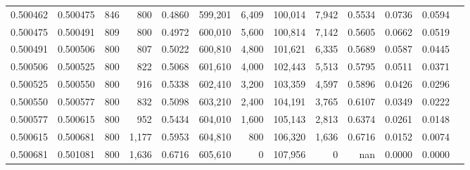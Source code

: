 \begin{tabular}{rrrrrrrrrrrrr}
0.500462 & 0.500475 &    846 &   800 &                                     0.4860 & 599,201 &   6,409 & 100,014 &   7,942 & 0.5534 & 0.0736 & 0.0594 \\
0.500475 & 0.500491 &    809 &   800 &                                     0.4972 & 600,010 &   5,600 & 100,814 &   7,142 & 0.5605 & 0.0662 & 0.0519 \\
0.500491 & 0.500506 &    800 &   807 &                                     0.5022 & 600,810 &   4,800 & 101,621 &   6,335 & 0.5689 & 0.0587 & 0.0445 \\
0.500506 & 0.500525 &    800 &   822 &                                     0.5068 & 601,610 &   4,000 & 102,443 &   5,513 & 0.5795 & 0.0511 & 0.0371 \\
0.500525 & 0.500550 &    800 &   916 &                                     0.5338 & 602,410 &   3,200 & 103,359 &   4,597 & 0.5896 & 0.0426 & 0.0296 \\
0.500550 & 0.500577 &    800 &   832 &                                     0.5098 & 603,210 &   2,400 & 104,191 &   3,765 & 0.6107 & 0.0349 & 0.0222 \\
0.500577 & 0.500615 &    800 &   952 &                                     0.5434 & 604,010 &   1,600 & 105,143 &   2,813 & 0.6374 & 0.0261 & 0.0148 \\
0.500615 & 0.500681 &    800 & 1,177 &                                     0.5953 & 604,810 &     800 & 106,320 &   1,636 & 0.6716 & 0.0152 & 0.0074 \\
0.500681 & 0.501081 &    800 & 1,636 &                                     0.6716 & 605,610 &       0 & 107,956 &       0 &    nan & 0.0000 & 0.0000 \\
\bottomrule
\end{tabular}
